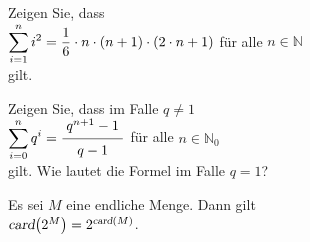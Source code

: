 \exercise
Zeigen Sie, dass
\\[0.2cm]
\hspace*{1.3cm}
$\displaystyle\sum\limits_{i=1}^{n} i^2 = \frac{1}{6} \cdot n \cdot (n+1) \cdot (2 \cdot n + 1)$ \quad
für alle $n \in \mathbb{N}$ 
\\[0.2cm]
gilt.  \exend

\exercise
Zeigen Sie, dass im Falle $q \not= 1$
\\[0.2cm]
\hspace*{1.3cm}
$\ds\sum\limits_{i=0}^{n} q^i = \bruch{q^{n+1} - 1}{q - 1}$ \quad
für alle $n \in \mathbb{N}_0$ 
\\[0.2cm]
gilt.  Wie lautet die Formel im Falle $q=1$? \exend


\begin{Satz}
Es sei $M$ eine endliche Menge.  Dann gilt
\\[0.2cm]
\hspace*{1.3cm}
$\textsl{card}\bigl(2^M\bigr) = 2^{\textsl{card}(M)}$.
\end{Satz}


